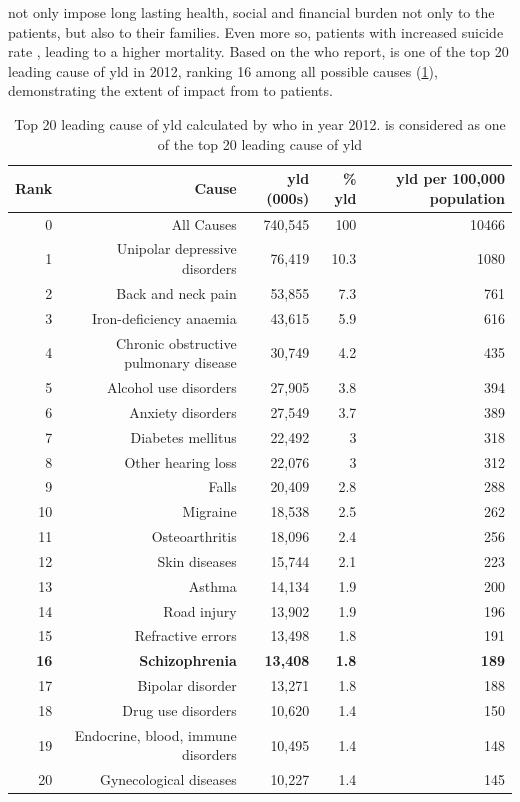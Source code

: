 \documentclass{book}
\begin{document}
	 not only impose long lasting health, social and financial burden not only to the patients, but also to their families\citep{Knapp2004}. 
	Even more so, patients with  increased suicide rate \citep{Saha2007}, leading to a higher mortality.
	Based on the \gls{who} report,  is one of the top 20 leading cause of \gls{yld} in 2012, ranking 16 among all possible causes (\cref{tab:whoYLD}), demonstrating the extent of impact from  to patients.
	\begin{table}
		\centering
		\caption[Top 20 leading cause of  calculated by  in year 2012]{Top 20 leading cause of \gls{yld} calculated by \gls{who} in year 2012.
			 is considered as one of the top 20 leading cause of \gls{yld}\citep{Geneva2013}}
		\begin{tabular}{rrrrr}
			\toprule
			Rank  & Cause & \gls{yld} (000s) & \% \gls{yld} & \gls{yld} per 100,000 population \\
			\midrule
			0     & All Causes & 740,545 & 100   & 10466 \\
			1     & Unipolar depressive disorders & 76,419 & 10.3  & 1080 \\
			2     & Back and neck pain & 53,855 & 7.3   & 761 \\
			3     & Iron-deficiency anaemia & 43,615 & 5.9   & 616 \\
			4     & Chronic obstructive pulmonary disease & 30,749 & 4.2   & 435 \\
			5     & Alcohol use disorders & 27,905 & 3.8   & 394 \\
			6     & Anxiety disorders & 27,549 & 3.7   & 389 \\
			7     & Diabetes mellitus & 22,492 & 3     & 318 \\
			8     & Other hearing loss & 22,076 & 3     & 312 \\
			9     & Falls & 20,409 & 2.8   & 288 \\
			10    & Migraine & 18,538 & 2.5   & 262 \\
			11    & Osteoarthritis & 18,096 & 2.4   & 256 \\
			12    & Skin diseases & 15,744 & 2.1   & 223 \\
			13    & Asthma & 14,134 & 1.9   & 200 \\
			14    & Road injury & 13,902 & 1.9   & 196 \\
			15    & Refractive errors & 13,498 & 1.8   & 191 \\
			\textbf{16}    & \textbf{Schizophrenia} & \textbf{13,408} & \textbf{1.8}   & \textbf{189} \\
			17    & Bipolar disorder & 13,271 & 1.8   & 188 \\
			18    & Drug use disorders & 10,620 & 1.4   & 150 \\
			19    & Endocrine, blood, immune disorders & 10,495 & 1.4   & 148 \\
			20    & Gynecological diseases & 10,227 & 1.4   & 145 \\
			\bottomrule
		\end{tabular}%
		\label{tab:whoYLD}%
	\end{table}%
	
\end{document}

